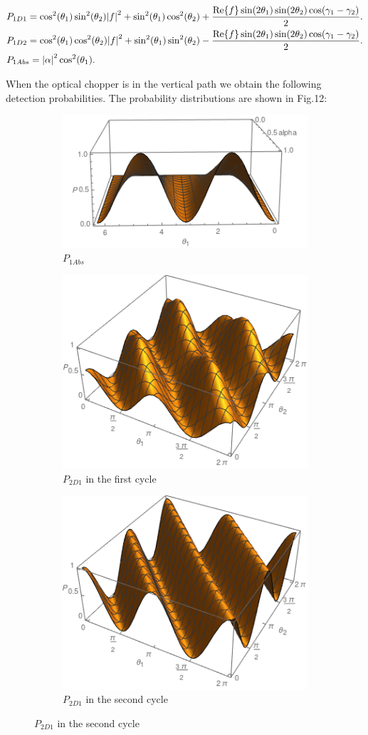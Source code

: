 \documentclass[12pt]{book}
\begin{document}
\begin{align}
&P_{1D1}=\cos^2(\theta_{1})\sin^2(\theta_{2})\abs{f}^2+ \sin^2(\theta_{1})\cos^2(\theta_{2})+\frac{\Re{f} \sin(2\theta_{1})\sin(2\theta_{2})\cos(\gamma_{1}-\gamma_{2})}{2}.\\
&P_{1D2}=\cos^2(\theta_{1})\cos^2(\theta_{2})\abs{f}^2+ \sin^2(\theta_{1})\sin^2(\theta_{2})-\frac{\Re{f} \sin(2\theta_{1})\sin(2\theta_{2})\cos(\gamma_{1}-\gamma_{2})}{2}.\\
&P_{1Abs}=\abs{\alpha}^2 \cos^2(\theta_{1}).
\end{align}


When the optical chopper is in the vertical path we obtain the following detection probabilities. The probability distributions are shown in Fig.12:

\begin{figure}[!h]
\centering
\begin{subfigure}[b]{0.40\linewidth}
\includegraphics[width=\linewidth,height=3 cm]{images/pcabs.png}
\caption{$P_{1Abs}$}
\label{fig:BS1}
\end{subfigure}
\begin{subfigure}[b]{0.40\linewidth}
\includegraphics[width=\linewidth,height=3 cm]{images/pcd21.png}
\caption{$P_{2D1}$ in the first cycle }
\label{fig:BS1}
\end{subfigure}
\begin{subfigure}[b]{0.40\linewidth}
\includegraphics[width=\linewidth,height=3 cm]{images/pcd22.png}
\caption{$P_{2D1}$ in the second cycle}
\label{fig:BS1}
\end{subfigure}

\end{figure}
\end{document}

